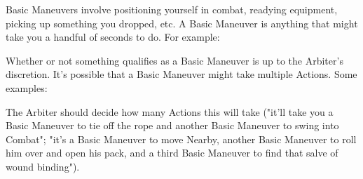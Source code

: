 \vspace{2pt}

\begin{multicols*}{2}




  Basic Maneuvers involve positioning yourself in combat, readying equipment, picking up something you dropped, etc.  A Basic Maneuver is anything that might take you a handful of seconds to do.  For example:


  Whether or not something qualifies as a Basic Maneuver is up to the Arbiter's discretion.  It's possible that a Basic Maneuver might take multiple Actions. Some examples:


  The Arbiter should decide how many Actions this will take ("it'll take you a Basic Maneuver to tie off the rope and another Basic Maneuver to swing into Combat"; "it's a Basic Maneuver to move Nearby, another Basic Maneuver to roll him over and open his pack, and a third Basic Maneuver to find that salve of wound binding").

\end{multicols*}

